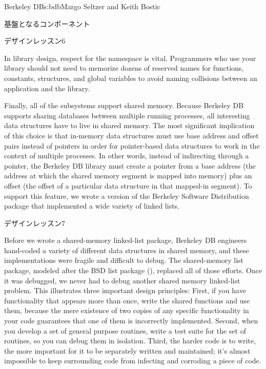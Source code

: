 \begin{aosachapter}{Berkeley DB}{s:bdb}{Margo Seltzer and Keith Bostic}
\begin{aosasect1}{基盤となるコンポーネント}
\begin{aosabox}{デザインレッスン6}

In library design, respect for the namespace is vital. Programmers who
use your library should not need to memorize dozens of reserved names
for functions, constants, structures, and global variables to avoid
naming collisions between an application and the library.

\end{aosabox}

Finally, all of the subsystems support shared memory. Because Berkeley
DB supports sharing databases between multiple running processes, all
interesting data structures have to live in shared memory. The most
significant implication of this choice is that in-memory data
structures must use base address and offset pairs instead of pointers
in order for pointer-based data structures to work in the context of
multiple processes. In other words, instead of indirecting through a
pointer, the Berkeley DB library must create a pointer from a base
address (the address at which the shared memory segment is mapped into
memory) plus an offset (the offset of a particular data structure in
that mapped-in segment). To support this feature, we
wrote a version of the Berkeley Software Distribution  package
that implemented a wide variety of linked lists. 

\begin{aosabox}{デザインレッスン7}

Before we wrote a shared-memory linked-list package, Berkeley DB
engineers hand-coded a variety of different data structures in shared
memory, and these implementations were fragile and difficult to
debug. The shared-memory list package, modeled after the BSD list
package (), replaced all of those efforts.  Once it was
debugged, we never had to debug another shared memory linked-list
problem.  This illustrates three important design principles: First,
if you have functionality that appears more than once, write the
shared functions and use them, because the mere existence of two
copies of any specific functionality in your code guarantees that one
of them is incorrectly implemented.  Second, when you develop a set of
general purpose routines, write a test suite for the set of routines,
so you can debug them in isolation.  Third, the harder code is to
write, the more important for it to be separately written and
maintained; it's almost impossible to keep surrounding code from
infecting and corroding a piece of code.


\end{aosabox}
\end{aosasect1}
\end{aosachapter}
